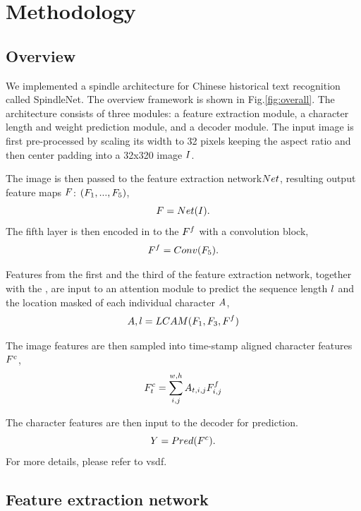 \section{Methodology}
\subsection{Overview}
We implemented a spindle architecture for Chinese historical text recognition called SpindleNet. 
The overview framework is shown in Fig.\ref{fig:overall}. The architecture consists of three modules: a feature extraction module, a character length and weight prediction module, and a decoder module. The input image is first pre-processed by scaling its width to 32 pixels keeping the aspect ratio and then center padding into a 32x320 image $I$. 

The image is then passed to the feature extraction network$Net$, resulting output feature maps $F$: $(F_{{1}}, ... ,F_{{5}})$, 
\begin{equation}
    F=Net(I).
\end{equation}
The fifth layer is then encoded in to the \Tefinalfeat{} $F^f{}$ with a convolution block,
\begin{equation}
    F^f=Conv(F_{{5}}).
\end{equation}

Features from the first and the third of the feature extraction network, together with the \Tefinalfeat{}, are input to an attention module to predict the sequence length $l$ and the location masked of each individual character $A$,
\begin{equation}
    A,l=LCAM(F_{{1}}, F_{{3}}, F^f{})
\end{equation}

The image features are then sampled into time-stamp aligned character features $F^{c}$, 
\begin{equation}
    F^{c}_{{t}}=\sum_{i,j}^{w,h} A_{t,i,j}F^f_{i,j}
\end{equation}

The character features are then input to the decoder for prediction. 
\begin{equation}
    Y=Pred(F^{c}).
\end{equation}
For more details, please refer to vsdf\cite{vsdf}.

\subsection{Feature extraction network}

